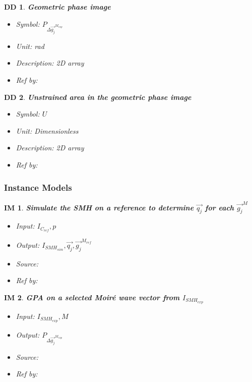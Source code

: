 \documentclass[12pt]{article}
\newtheorem{DD}{DD}
\newtheorem{IM}{IM}
\begin{document}
\begin{DD}
\normalfont \textbf{Geometric phase image}
\begin{itemize}
\item {Symbol}: $P_{\Delta\overrightarrow{g_{j}}^{M_{exp}}}$
\item {Unit}: rad
\item {Description}: 2D array
\item {Ref by}:
\end{itemize}
\label{DD_12}
\end{DD}

\begin{DD}
\normalfont \textbf{Unstrained area in the geometric phase image}
\begin{itemize}
\item {Symbol}: $U$
\item {Unit}: Dimensionless
\item {Description}: 2D array
\item {Ref by}:
\end{itemize}
\label{DD_13}
\end{DD}

\subsubsection{Instance Models} \label{sec_instance}    

\renewcommand{\labelitemi}{$-$}

\begin{IM}
\noindent\colorbox{shadecolorIM}{\normalfont \textbf{Simulate the SMH on a reference to determine $\overrightarrow{q_{j}}$ for each $\vec{g_j}^{M}$}}
\normalfont
\begin{itemize}
\item Input: $I_{C_{ref}}, p$
\item Output: $I_{SMH_{sim}}, \overrightarrow{q_{j}}, \overrightarrow{g_j}^{M_{ref}}$
\item Source:
\item Ref by:
\end{itemize}
\label{IM_1}
\end{IM}

\begin{IM}
\noindent\colorbox{shadecolorIM}{\normalfont \textbf{GPA on a selected Moir{\'e} wave vector from $I_{SMH_{exp}}$}}
\normalfont
\begin{itemize}
\item Input: $I_{SMH_{exp}}, M$
\item Output: $P_{\Delta \overrightarrow{g_{j}}^{M_{exp}}}$
\item Source:
\item Ref by:
\end{itemize}
\label{IM_2}
\end{IM}
\end{document}
